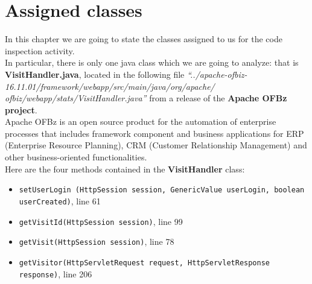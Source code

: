\pagebreak
\section{Assigned classes}
In this chapter we are going to state the classes assigned to us for the code inspection activity. \\
In particular, there is only one java class which we are going to analyze: that is \textbf{VisitHandler.java}, located in the following file \textit{``../apache-ofbiz-16.11.01/framework/webapp/src/main/java/org/apache/\\ofbiz/webapp/stats/VisitHandler.java''} from a release of the \textbf{Apache OFBz project}.\\
Apache OFBz is an open source product for the automation of enterprise processes that includes framework component and business applications for ERP (Enterprise Resource Planning), CRM (Customer Relationship Management) and other business-oriented functionalities.\\

Here are the four methods contained in the \textbf{VisitHandler} class:
\begin{itemize}
	\item \texttt{setUserLogin (HttpSession session, GenericValue userLogin, boolean userCreated)}, line 61
	\item \texttt{getVisitId(HttpSession session)}, line 99
	\item \texttt{getVisit(HttpSession session)}, line 78
	\item \texttt{getVisitor(HttpServletRequest request, HttpServletResponse response)}, line 206
\end{itemize}
